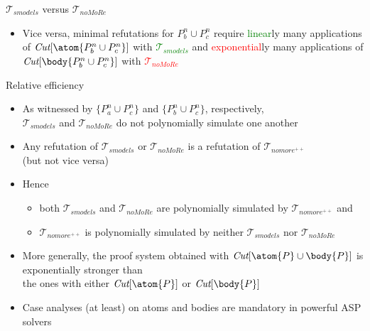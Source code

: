 \begin{frame}{${\mathcal{T}}_{\textit{smodels}}$ versus ${\mathcal{T}}_{\textit{noMoRe}}$}
\begin{itemize}
    \pause[4]
    the number of applications of
    \textcolor<4,7>{green}{$\textit{Cut}[\body{P^n_a\cup P^n_c}]$} with
    \textcolor<4>{green}{${\mathcal{T}}_{\textit{noMoRe}}$} is
    \textcolor<4,7>{green}{linear} in $n$,
    whereas
    \textcolor<4>{red}{${\mathcal{T}}_{\textit{smodels}}$} requires
    \textcolor<4,8>{red}{exponential}ly many applications of
    \textcolor<4,8>{red}{$\textit{Cut}[\atom{P^n_a\cup P^n_c}]$}
  \item <5-> Vice versa, \alert<5>{minimal refutations} for \alert<5>{$P^n_b\cup P^n_c$}
    \pause[6]
    require
    \textcolor<6,8>{green}{linear}ly many applications of
    \textcolor<6,8>{green}{$\textit{Cut}[\atom{P^n_b\cup P^n_c}]$} with
    \textcolor<6>{green}{${\mathcal{T}}_{\textit{smodels}}$}
    and
    \textcolor<6,7>{red}{exponential}ly many applications of
    \textcolor<6,7>{red}{$\textit{Cut}[\body{P^n_b\cup P^n_c}]$} with
    \textcolor<6>{red}{${\mathcal{T}}_{\textit{noMoRe}}$}
\end{itemize}
\end{frame}
\begin{frame}{Relative efficiency}
  \begin{itemize}
  \item<1-> As witnessed by $\{P^n_a\cup P^n_c\}$ and $\{P^n_b\cup P^n_c\}$, respectively, \\
    ${\mathcal{T}}_{\textit{smodels}}$ and ${\mathcal{T}}_{\textit{noMoRe}}$ do not polynomially
    simulate one another
  \item<2-> Any refutation of ${\mathcal{T}}_{\textit{smodels}}$ or
    ${\mathcal{T}}_{\textit{noMoRe}}$ is a refutation of ${\mathcal{T}}_{\textit{nomore}^{++}}$ \\
    (but not vice versa)
  \item<3-> Hence
    \begin{itemize}
    \item both ${\mathcal{T}}_{\textit{smodels}}$ and ${\mathcal{T}}_{\textit{noMoRe}}$
      are polynomially simulated by ${\mathcal{T}}_{\textit{nomore}^{++}}$ and
    \item ${\mathcal{T}}_{\textit{nomore}^{++}}$ is polynomially simulated
      by neither ${\mathcal{T}}_{\textit{smodels}}$ nor ${\mathcal{T}}_{\textit{noMoRe}}$
    \end{itemize}
     \bigskip
  \item<4-> More generally,
    the proof system obtained with $\textit{Cut}[\atom{P}\cup\body{P}]$ is \alert{exponentially stronger} than
    \\
    the ones with either $\textit{Cut}[\atom{P}]$ or $\textit{Cut}[\body{P}]$
  \item<5-> Case analyses (at least) on atoms and bodies are mandatory in powerful ASP solvers
\end{itemize}
\end{frame}
